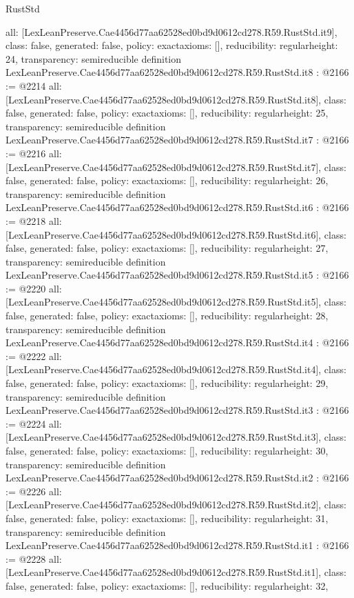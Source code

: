 \begin{lexlean}{RustStd}
\begin{coremodule}
{  all: [LexLeanPreserve.Cae4456d77aa62528ed0bd9d0612cd278.R59.RustStd.it9],
  class: false,
  generated: false,
  policy: exact{axioms: []},
  reducibility: regular{height: 24},
  transparency: semireducible
}
definition LexLeanPreserve.Cae4456d77aa62528ed0bd9d0612cd278.R59.RustStd.it8 : @2166 := @2214 {
  all: [LexLeanPreserve.Cae4456d77aa62528ed0bd9d0612cd278.R59.RustStd.it8],
  class: false,
  generated: false,
  policy: exact{axioms: []},
  reducibility: regular{height: 25},
  transparency: semireducible
}
definition LexLeanPreserve.Cae4456d77aa62528ed0bd9d0612cd278.R59.RustStd.it7 : @2166 := @2216 {
  all: [LexLeanPreserve.Cae4456d77aa62528ed0bd9d0612cd278.R59.RustStd.it7],
  class: false,
  generated: false,
  policy: exact{axioms: []},
  reducibility: regular{height: 26},
  transparency: semireducible
}
definition LexLeanPreserve.Cae4456d77aa62528ed0bd9d0612cd278.R59.RustStd.it6 : @2166 := @2218 {
  all: [LexLeanPreserve.Cae4456d77aa62528ed0bd9d0612cd278.R59.RustStd.it6],
  class: false,
  generated: false,
  policy: exact{axioms: []},
  reducibility: regular{height: 27},
  transparency: semireducible
}
definition LexLeanPreserve.Cae4456d77aa62528ed0bd9d0612cd278.R59.RustStd.it5 : @2166 := @2220 {
  all: [LexLeanPreserve.Cae4456d77aa62528ed0bd9d0612cd278.R59.RustStd.it5],
  class: false,
  generated: false,
  policy: exact{axioms: []},
  reducibility: regular{height: 28},
  transparency: semireducible
}
definition LexLeanPreserve.Cae4456d77aa62528ed0bd9d0612cd278.R59.RustStd.it4 : @2166 := @2222 {
  all: [LexLeanPreserve.Cae4456d77aa62528ed0bd9d0612cd278.R59.RustStd.it4],
  class: false,
  generated: false,
  policy: exact{axioms: []},
  reducibility: regular{height: 29},
  transparency: semireducible
}
definition LexLeanPreserve.Cae4456d77aa62528ed0bd9d0612cd278.R59.RustStd.it3 : @2166 := @2224 {
  all: [LexLeanPreserve.Cae4456d77aa62528ed0bd9d0612cd278.R59.RustStd.it3],
  class: false,
  generated: false,
  policy: exact{axioms: []},
  reducibility: regular{height: 30},
  transparency: semireducible
}
definition LexLeanPreserve.Cae4456d77aa62528ed0bd9d0612cd278.R59.RustStd.it2 : @2166 := @2226 {
  all: [LexLeanPreserve.Cae4456d77aa62528ed0bd9d0612cd278.R59.RustStd.it2],
  class: false,
  generated: false,
  policy: exact{axioms: []},
  reducibility: regular{height: 31},
  transparency: semireducible
}
definition LexLeanPreserve.Cae4456d77aa62528ed0bd9d0612cd278.R59.RustStd.it1 : @2166 := @2228 {
  all: [LexLeanPreserve.Cae4456d77aa62528ed0bd9d0612cd278.R59.RustStd.it1],
  class: false,
  generated: false,
  policy: exact{axioms: []},
  reducibility: regular{height: 32},
}
\end{coremodule}
\end{lexlean}
